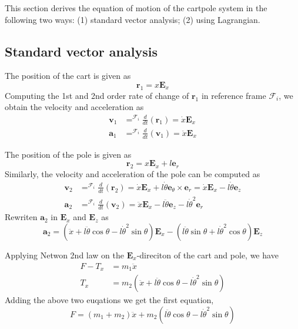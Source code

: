 This section derives the equation of motion of the cartpole system in the following two ways: (1) standard vector analysis; (2) using Lagrangian.

\subsection{Standard vector analysis}

The position of the cart is given as
\begin{equation}
    \mathbf{r}_1=x\mathbf{E}_x
\end{equation}
Computing the 1st and 2nd order rate of change of $\mathbf{r}_1$ in reference frame $\mathcal{F}_i$, we obtain the velocity and acceleration as
\begin{align}
    \mathbf{v}_1 &= ^{\mathcal{F}_i}\frac{d}{dt}(\mathbf{r}_1)=\dot{x}\mathbf{E}_x \\
    \mathbf{a}_1 &= ^{\mathcal{F}_i}\frac{d}{dt}(\mathbf{v}_1)=\ddot{x}\mathbf{E}_x
\end{align}


The position of the pole is given as
\begin{equation}
    \mathbf{r}_2=x\mathbf{E}_x + l\mathbf{e}_r
\end{equation}
Similarly, the velocity and acceleration of the pole can be computed as
\begin{align}
    \mathbf{v}_2 &= ^{\mathcal{F}_i}\frac{d}{dt}(\mathbf{r}_2) = \dot{x}\mathbf{E}_x + l\dot{\theta}\mathbf{e}_\theta\times\mathbf{e}_r=\dot{x}\mathbf{E}_x-l\dot{\theta}\mathbf{e}_z\\
    \mathbf{a}_2 &= ^{\mathcal{F}_i}\frac{d}{dt}(\mathbf{v}_2) = \ddot{x}\mathbf{E}_x -l\ddot{\theta}\mathbf{e}_z-l\dot{\theta}^2\mathbf{e}_r
\end{align}
Rewriten $\mathbf{a}_2$ in $\mathbf{E}_x$ and $\mathbf{E}_z$ as
\begin{equation}
    \mathbf{a}_2 = (\ddot{x} + l\ddot{\theta}\cos\theta - l\dot{\theta}^2\sin\theta)\mathbf{E}_x - (l\ddot{\theta}\sin\theta+l\dot{\theta}^2\cos\theta)\mathbf{E}_z
\end{equation}

Applying Netwon 2nd law on the $\mathbf{E}_x$-direciton of the cart and pole, we have
\begin{align}
    F - T_x &= m_1\ddot{x}\\
    T_x &= m_2(\ddot{x} + l\ddot{\theta}\cos\theta - l\dot{\theta}^2\sin\theta)
\end{align}
Adding the above two euqations we get the first equation,
\begin{equation}
    F = (m_1+m_2)\ddot{x} + m_2(l\ddot{\theta}\cos\theta - l\dot{\theta}^2\sin\theta)
\end{equation}

